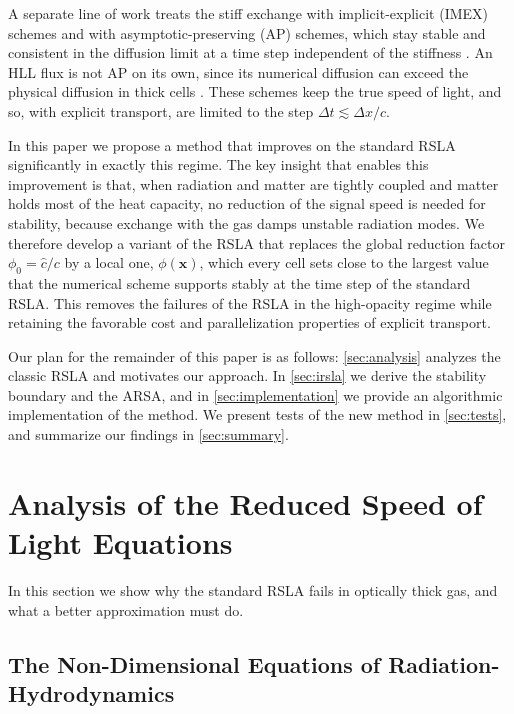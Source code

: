 \documentclass[preprint,12pt,authoryear]{elsarticle}
\begin{document}
A separate line of work treats the stiff exchange with implicit-explicit (IMEX) schemes \citep{Jin96a} and with asymptotic-preserving (AP) schemes, which stay stable and consistent in the diffusion limit at a time step independent of the stiffness \citep{Jin99a}. An HLL flux is not AP on its own, since its numerical diffusion can exceed the physical diffusion in thick cells \citep{lowrie01, He24a}. These schemes keep the true speed of light, and so, with explicit transport, are limited to the step $\Delta t \lesssim \Delta x/c$.


In this paper we propose a method that improves on the standard RSLA significantly in exactly this regime. The key insight that enables this improvement is that, when radiation and matter are tightly coupled and matter holds most of the heat capacity, no reduction of the signal speed is needed for stability, because exchange with the gas damps unstable radiation modes. We therefore develop a variant of the RSLA that replaces the global reduction factor $\phi_0 = \hat{c}/c$ by a local one, $\phi(\mathbf{x})$, which every cell sets close to the largest value that the numerical scheme supports stably at the time step of the standard RSLA. This removes the failures of the RSLA in the high-opacity regime while retaining the favorable cost and parallelization properties of explicit transport.

Our plan for the remainder of this paper is as follows: \autoref{sec:analysis} analyzes the classic RSLA and motivates our approach. In \autoref{sec:irsla} we derive the stability boundary and the ARSA, and in \autoref{sec:implementation} we provide an algorithmic implementation of the method. We present tests of the new method in \autoref{sec:tests}, and summarize our findings in \autoref{sec:summary}.

\section{Analysis of the Reduced Speed of Light Equations}
\label{sec:analysis}

In this section we show why the standard RSLA fails in optically thick gas, and what a better approximation must do.


\subsection{The Non-Dimensional Equations of Radiation-Hydrodynamics}
\label{ssec:nondim}
\end{document}
